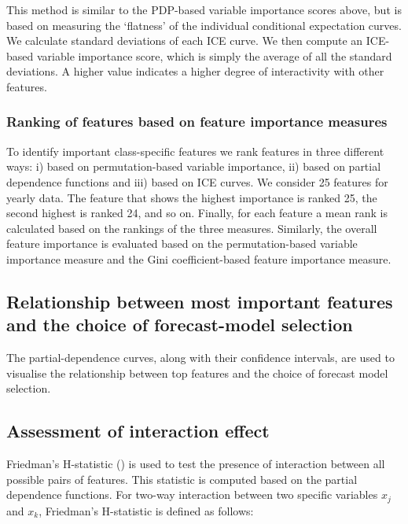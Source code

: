 \documentclass[11pt,a4paper,]{article}
\begin{document}
This method is similar to the PDP-based variable importance scores above, but is based on measuring the `flatness' of the individual conditional expectation curves. We calculate standard deviations of each ICE curve. We then compute an ICE-based variable importance score, which is simply the average of all the standard deviations. A higher value indicates a higher degree of interactivity with other features.

\hypertarget{ranking-of-features-based-on-feature-importance-measures}{%
\subsubsection{Ranking of features based on feature importance measures}\label{ranking-of-features-based-on-feature-importance-measures}}

To identify important class-specific features we rank features in three different ways: i) based on permutation-based variable importance, ii) based on partial dependence functions and iii) based on ICE curves. We consider 25 features for yearly data. The feature that shows the highest importance is ranked 25, the second highest is ranked 24, and so on. Finally, for each feature a mean rank is calculated based on the rankings of the three measures. Similarly, the overall feature importance is evaluated based on the permutation-based variable importance measure and the Gini coefficient-based feature importance measure.

\hypertarget{relationship-between-most-important-features-and-the-choice-of-forecast-model-selection}{%
\subsection{Relationship between most important features and the choice of forecast-model selection}\label{relationship-between-most-important-features-and-the-choice-of-forecast-model-selection}}

The partial-dependence curves, along with their confidence intervals, are used to visualise the relationship between top features and the choice of forecast model selection.

\hypertarget{assessment-of-interaction-effect}{%
\subsection{Assessment of interaction effect}\label{assessment-of-interaction-effect}}

Friedman's H-statistic (\textcite{friedman2008predictive}) is used to test the presence of interaction between all possible pairs of features. This statistic is computed based on the partial dependence functions. For two-way interaction between two specific variables \(x_j\) and \(x_k\), Friedman's H-statistic is defined as follows:
\end{document}
